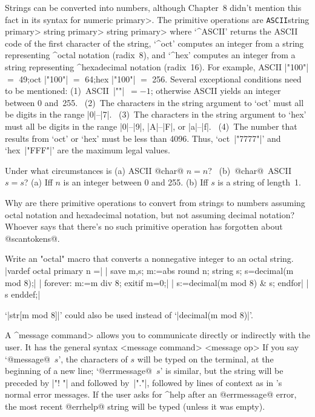 \ddanger Strings can be converted into numbers, although Chapter~8
didn't mention this fact in its syntax for \<numeric primary>. The
primitive operations are
\begindisplay
{\tt ASCII}\thinspace\<string primary>\alt
{}\thinspace\<string primary>\alt
{}\thinspace\<string primary>
\enddisplay
where `^{ASCII}' returns the ASCII code of the first character of the
string, `^{oct}' computes an integer from a string representing
^{octal notation} (radix~8), and `^{hex}' computes an integer from
a string representing ^{hexadecimal notation} (radix~16). For example,
\begindisplay
ASCII |"100"| $=$ 49;\qquad oct |"100"| $=$ 64;\qquad hex |"100"| $=$ 256.
\enddisplay
Several exceptional conditions need to be mentioned:
(1)~ASCII~|""|~$=-1$; otherwise ASCII yields an integer between 0 and~255.
\ (2)~The characters in the string argument to `oct' must all be
digits in the range |0|--|7|.
\ (3)~The characters in the string argument to `hex' must all be
digits in the range |0|--|9|, |A|--|F|, or |a|--|f|.
\ (4)~The number that results from `oct' or `hex' must be less than 4096.
Thus, `oct~|"7777"|' and `hex~|"FFF"|' are the maximum legal values.

\ddangerexercise Under what circumstances is (a) ASCII @char@ $n=n$?
\ (b)~@char@~ASCII~$s=s$?
\answer (a) Iff $n$ is an integer between 0 and 255.
(b) Iff $s$ is a string of length~1.

\ddangerexercise Why are there primitive operations to convert from
strings to numbers assuming octal notation and hexadecimal notation,
but not assuming decimal notation?
\answer Whoever says that there's no such primitive operation has
forgotten about @scantokens@.

\ddangerexercise Write an "octal" macro that converts a nonnegative
integer to an octal string.
\answer |vardef octal primary n =|\parbreak
| save m,s; m:=abs round n; string s; s=decimal(m mod 8);|\parbreak
| forever: m:=m div 8; exitif m=0;|\parbreak
|  s:=decimal(m mod 8) & s; endfor|\parbreak
| s enddef;|\par\nobreak\medskip\noindent
`|str[m mod 8]|' could also be used instead of `|decimal(m mod 8)|'.

\ddanger A ^\<message command> allows you to communicate directly
or indirectly with the user. It has the general syntax
\beginsyntax
<message command>
<message op>\is[message]\alt[errmessage]\alt[errhelp]
\endsyntax
If you say `@message@~$s$', the characters of $s$ will be typed on the
terminal, at the beginning of a new line; `@errmessage@~$s$' is
similar, but the string will be preceded by |"! "| and followed
by~|"."|, followed by lines of context as in \MF's normal error messages.
If the user asks for ^{help} after an @errmessage@ error,
the most recent @errhelp@ string will be typed (unless it was empty).

